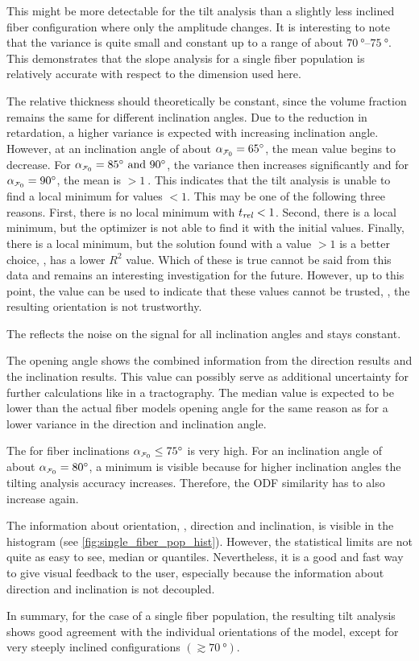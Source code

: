 This might be more detectable for the tilt analysis than a slightly less inclined fiber configuration where only the amplitude changes.
It is interesting to note that the variance is quite small and constant up to a range of about $\SIrange{70}{75}{\degree}$.
This demonstrates that the slope analysis for a single fiber population is relatively accurate with respect to the dimension used here.
\par
%
The relative thickness \trel{} should theoretically be constant, since the volume fraction remains the same for different inclination angles.
Due to the reduction in retardation, a higher variance is expected with increasing inclination angle.
However, at an inclination angle of about $\modelInc=\SI{65}{\degree}$, the mean value begins to decrease.
For $\modelInc=\SIlist{85;90}{\degree}$, the variance then increases significantly and for $\modelInc=\SI{90}{\degree}$, the mean is $>\SI{1}{}$.
This indicates that the tilt analysis is unable to find a local minimum for \trel{} values $<1$.
This may be one of the following three reasons.
First, there is no local minimum with $\textnormal{$t_\mathit{rel}$}<1$.
Second, there is a local minimum, but the optimizer is not able to find it with the initial values.
Finally, there is a local minimum, but the solution found with a \trel{} value $>1$ is a better choice, \ie{}, has a lower $R^2$ value.
Which of these is true cannot be said from this data and remains an interesting investigation for the future.
However, up to this point, the \trel{} value can be used to indicate that these values cannot be trusted, \ie{}, the resulting orientation is not trustworthy.
\par
%
The \rvalue{} reflects the noise on the signal for all inclination angles and stays constant.
\par
%
The opening angle shows the combined information from the direction results and the inclination results.
This value can possibly serve as additional uncertainty for further calculations like in a tractography.
The median value is expected to be lower than the actual fiber models opening angle for the same reason as for a lower \bvariance{} variance in the direction and inclination angle.
\par
%
The \accvalue{} for fiber inclinations $\modelInc \leq \SI{75}{\degree}$ is very high.
For an inclination angle of about $\modelInc = \SI{80}{\degree}$, a minimum is visible because for higher inclination angles the tilting analysis accuracy increases.
Therefore, the \ac{ODF} similarity has to also increase again.
\par
%
The information about orientation, \ie{}, direction and inclination, is visible in the histogram (see \cref*{fig:single_fiber_pop_hist}).
However, the statistical limits are not quite as easy to see, \eg{} median or quantiles.
Nevertheless, it is a good and fast way to give visual feedback to the user, especially because the information about direction and inclination is not decoupled.
\par
%
In summary, for the case of a single fiber population, the resulting tilt analysis shows good agreement with the individual orientations of the model, except for very steeply inclined configurations $(\gtrsim \SI{70}{\degree})$.
%
%
%
